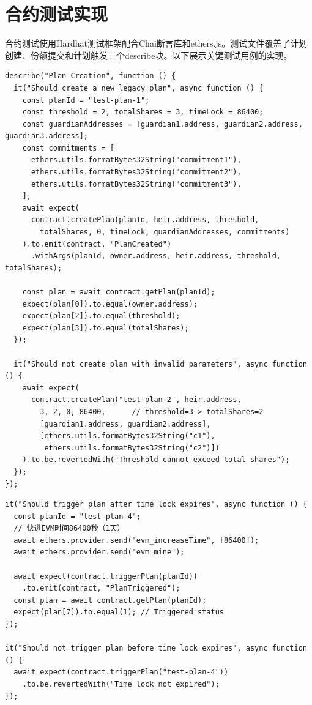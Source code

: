 \documentclass[UTF8,a4paper,zihao=-4,openany]{ctexrep}
\begin{document}
\section{合约测试实现}

合约测试使用Hardhat测试框架配合Chai断言库和ethers.js。测试文件覆盖了计划创建、份额提交和计划触发三个describe块。以下展示关键测试用例的实现。

\begin{lstlisting}[caption={合约计划创建测试 (LegacyContract.test.js:25-84, 节选)}]
describe("Plan Creation", function () {
  it("Should create a new legacy plan", async function () {
    const planId = "test-plan-1";
    const threshold = 2, totalShares = 3, timeLock = 86400;
    const guardianAddresses = [guardian1.address, guardian2.address, guardian3.address];
    const commitments = [
      ethers.utils.formatBytes32String("commitment1"),
      ethers.utils.formatBytes32String("commitment2"),
      ethers.utils.formatBytes32String("commitment3"),
    ];
    await expect(
      contract.createPlan(planId, heir.address, threshold,
        totalShares, 0, timeLock, guardianAddresses, commitments)
    ).to.emit(contract, "PlanCreated")
      .withArgs(planId, owner.address, heir.address, threshold, totalShares);

    const plan = await contract.getPlan(planId);
    expect(plan[0]).to.equal(owner.address);
    expect(plan[2]).to.equal(threshold);
    expect(plan[3]).to.equal(totalShares);
  });

  it("Should not create plan with invalid parameters", async function () {
    await expect(
      contract.createPlan("test-plan-2", heir.address,
        3, 2, 0, 86400,      // threshold=3 > totalShares=2
        [guardian1.address, guardian2.address],
        [ethers.utils.formatBytes32String("c1"),
         ethers.utils.formatBytes32String("c2")])
    ).to.be.revertedWith("Threshold cannot exceed total shares");
  });
});
\end{lstlisting}

\begin{lstlisting}[caption={合约时间锁触发测试 (LegacyContract.test.js:160-180, 节选)}]
it("Should trigger plan after time lock expires", async function () {
  const planId = "test-plan-4";
  // 快进EVM时间86400秒（1天）
  await ethers.provider.send("evm_increaseTime", [86400]);
  await ethers.provider.send("evm_mine");

  await expect(contract.triggerPlan(planId))
    .to.emit(contract, "PlanTriggered");
  const plan = await contract.getPlan(planId);
  expect(plan[7]).to.equal(1); // Triggered status
});

it("Should not trigger plan before time lock expires", async function () {
  await expect(contract.triggerPlan("test-plan-4"))
    .to.be.revertedWith("Time lock not expired");
});
\end{lstlisting}
\end{document}
